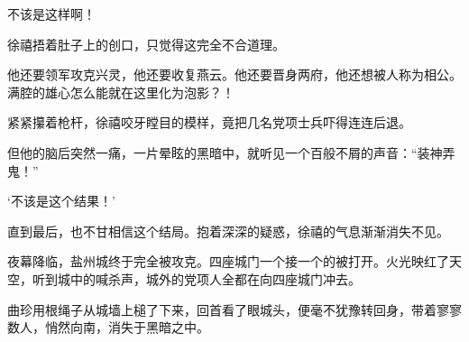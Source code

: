 不该是这样啊！

徐禧捂着肚子上的创口，只觉得这完全不合道理。

他还要领军攻克兴灵，他还要收复燕云。他还要晋身两府，他还想被人称为相公。满腔的雄心怎么能就在这里化为泡影？！

紧紧攥着枪杆，徐禧咬牙瞠目的模样，竟把几名党项士兵吓得连连后退。

但他的脑后突然一痛，一片晕眩的黑暗中，就听见一个百般不屑的声音：“装神弄鬼！”

‘不该是这个结果！’

直到最后，也不甘相信这个结局。抱着深深的疑惑，徐禧的气息渐渐消失不见。

夜幕降临，盐州城终于完全被攻克。四座城门一个接一个的被打开。火光映红了天空，听到城中的喊杀声，城外的党项人全都在向四座城门冲去。

曲珍用根绳子从城墙上槌了下来，回首看了眼城头，便毫不犹豫转回身，带着寥寥数人，悄然向南，消失于黑暗之中。

